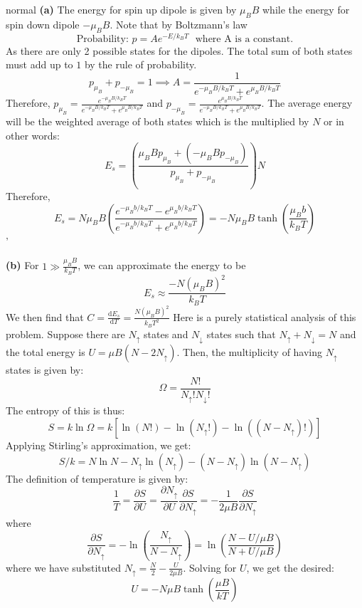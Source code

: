 \begin{solution}{normal}
\textbf{(a)} The energy for spin up dipole is given by $\mu_BB$ while the energy for spin down dipole $-\mu_BB$. Note that by Boltzmann’s law
\[\text{Probability:}\,\,p = Ae^{-E/k_BT}\,\,\,\,\text{where A is a constant}.\]
As there are only 2 possible states for the dipoles. The total sum of both states must add up to $1$ by the rule of probability. 
$$p_{\mu_B} + p_{-\mu_B} = 1\implies A = \frac{1}{e^{-\mu_BB/k_BT} + e^{\mu_BB/k_BT}}$$
Therefore, $ p_{\mu_B} = \frac{e^{-\mu_BB/k_BT}}{e^{-\mu_BB/k_BT} + e^{\mu_BB/k_BT}}$ and $ p_{-\mu_B} = \frac{e^{\mu_BB/k_BT}}{e^{-\mu_BB/k_BT} + e^{\mu_BB/k_BT}}$. The average energy will be the weighted average of both states which is the multiplied by $N$ or in other words:
$$E_s = \left(\frac{\mu_BBp_{\mu_B}+\left(-\mu_BBp_{-\mu_B}\right)}{p_{\mu_B}+p_{-\mu_B}}\right)N$$
Therefore,
$$E_s = N\mu_BB\left(\frac{e^{-\mu_Bb/k_BT}- e^{\mu_Bb/k_BT}}{e^{-\mu_Bb/k_BT}+e^{\mu_Bb/k_BT}}\right) = -N\mu_BB \tanh \left(\frac{\mu_Bb}{k_BT}\right) $$'

\textbf{(b)} For $1\gg \frac{\mu_BB}{k_BT}$, we can approximate the energy to be 
$$E_s \approx \frac{-N\left(\mu_BB\right)^2}{k_BT}$$
We then find that $C = \frac{\text{d}E_s}{\text{d}T} = \frac{N\left(\mu_BB\right)^2}{k_BT^2}$
\tcbline
Here is a purely statistical analysis of this problem. Suppose there are $N_\uparrow$ states and $N_\downarrow$ states such that $N_\uparrow+N_\downarrow=N$ and the total energy is $U=\mu B(N-2N_\uparrow)$. Then, the multiplicity of having $N_\uparrow$ states is given by:
$$\Omega = \frac{N!}{N_\uparrow!N_\downarrow!}$$The entropy of this is thus:
$$S=k\ln\Omega=k\left[\ln(N!)-\ln(N_\uparrow!)-\ln\left((N-N_\uparrow)!\right)\right]$$Applying Stirling's approximation, we get:
$$S/k=N\ln N-N_\uparrow \ln(N_\uparrow)-(N-N_\uparrow)\ln(N-N_\uparrow)$$The definition of temperature is given by:
$$\frac{1}{T}=\frac{\partial S}{\partial U} = \frac{\partial N_{\uparrow}}{\partial U} \frac{\partial S}{\partial N_{\uparrow}}=-\frac{1}{2\mu B}\frac{\partial S}{\partial N_\uparrow}$$where
$$\frac{\partial S}{\partial N_\uparrow}=-\ln\left(\frac{N_\uparrow}{N-N_\uparrow}\right)=\ln\left(\frac{N-U/\mu B}{N+U/\mu B}\right)$$where we have substituted $N_\uparrow = \frac{N}{2}-\frac{U}{2\mu B}$. Solving for $U$, we get the desired:
$$U=-N\mu B\tanh\left(\frac{\mu B}{kT}\right)$$
\end{solution}